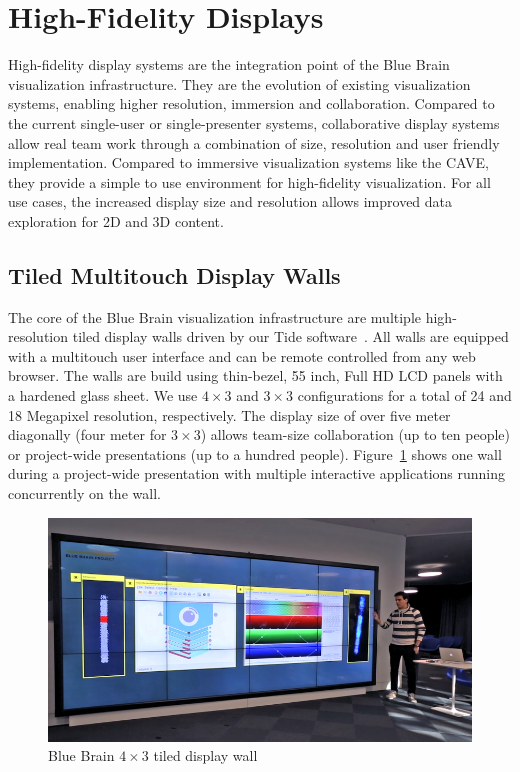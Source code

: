 \documentclass[10pt]{llncs}
\newcommand{\fig}[1]{Figure~\ref{#1}}
\begin{document}
\section{High-Fidelity Displays}

High-fidelity display systems are the integration point of the Blue Brain
visualization infrastructure. They are the evolution of existing visualization
systems, enabling higher resolution, immersion and collaboration. Compared to
the current single-user or single-presenter systems, collaborative display
systems allow real team work through a combination of size, resolution and user
friendly implementation. Compared to immersive visualization systems like the
CAVE, they provide a simple to use environment for high-fidelity visualization.
For all use cases, the increased display size and resolution allows improved
data exploration for 2D and 3D content.

\subsection{Tiled Multitouch Display Walls}

The core of the Blue Brain visualization infrastructure are multiple
high-resolution tiled display walls driven by our Tide software~\cite{tide}. All
walls are equipped with a multitouch user interface and can be remote controlled
from any web browser. The walls are build using thin-bezel, 55 inch, Full HD LCD
panels with a hardened glass sheet. We use $4\times 3$ and $3\times 3$
configurations for a total of 24 and 18 Megapixel resolution, respectively. The
display size of over five meter diagonally (four meter for $3\times 3$) allows
team-size collaboration (up to ten people) or project-wide presentations (up to
a hundred people). \fig{fTDW} shows one wall during a project-wide presentation
with multiple interactive applications running concurrently on the wall.

\begin{figure}[h!t]
  \includegraphics[width=\columnwidth]{images/tdw}
  \caption{\label{fTDW}Blue Brain $4\times 3$ tiled display wall}
\end{figure}
\end{document}

